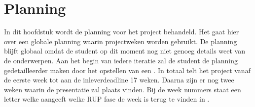 \documentclass[a4paper, 11pt, oneside]{report}
\begin{document}
\chapter{Planning}
\label{chapter:planning}
In dit hoofdstuk wordt de planning voor het project behandeld.
Het gaat hier over een globale planning waarin projectweken worden gebruikt.
De planning blijft globaal omdat de student op dit moment nog niet genoeg details weet van de onderwerpen.
Aan het begin van iedere iteratie zal de student de planning gedetailleerder maken door het opstellen van een . 
In totaal telt het project vanaf de eerste week tot aan de inleverdeadline 17 weken.
Daarna zijn er nog twee weken waarin de presentatie zal plaats vinden. 
Bij de week nummers staat een letter welke aangeeft welke RUP fase de week is terug te vinden in .
\end{document}
